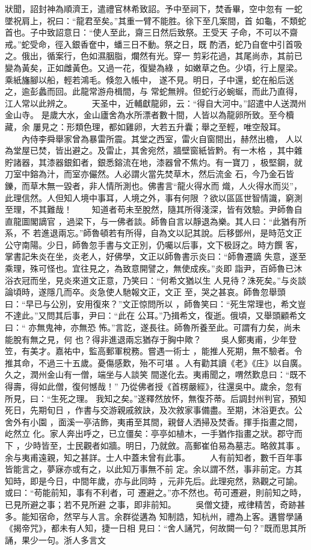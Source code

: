 \documentclass{ctexart}
\begin{document}
狀聞，詔封神為順濟王，遣禮官林希致詔。予中至祠下，焚香畢，空中忽有 一蛇墜祝肩上，祝曰：``龍君至矣。''其重一臂不能胜。徐下至几案間，首 如龜，不類蛇首也。子中致詔意日：``使人至此，齋三日然后致祭。王受天 子命，不可以不齋戒。''蛇受命，徑入銀香奩中，蟠三日不動。祭之日，既 酌洒，蛇乃自奩中引首吸之。俄出，循案行，色如濕胭脂，爛然有光。穿一 剪彩花過，其尾尚赤，其前已變為黃矣，正如雌黃色。又過一花，復變為綠 ，如嫩草之色。少頃，行上屋梁。乘紙旛腳以船，輕若鴻毛。倏忽入帳中， 遂不見。明日，子中還，蛇在船后送之，逾彭蠡而回。此龍常游舟楫間，与 常蛇無辨。但蛇行必蜿蜒，而此乃直得，江人常以此辨之。 　　天圣中，近輔獻龍卵，云：``得自大河中。''詔遣中人送潤州金山寺。 是歲大水，金山廬舍為水所漂者數十間，人皆以為龍卵所致。至今櫝藏，余 屢見之：形類色理，都如雞卵，大若五升囊；舉之至輕，唯空殼耳。 　　內侍李舜舉家曾為暴雷所震。其堂之西室，雷火自窗間出，赫然出檐， 人以為堂屋已焚，皆出避之。及雷止，其舍宛然，牆壁窗紙皆黔。有一木格 ，其中雜貯諸器，其漆器銀釦者，銀悉鎔流在地，漆器曾不焦灼。有一寶刀 ，极堅鋼，就刀室中鎔為汁，而室亦儼然。人必謂火當先焚草木，然后流金 石，今乃金石皆鑠，而草木無一毀者，非人情所測也。佛書言``龍火得水而 熾，人火得水而災''，此理信然。人但知人境中事耳，人境之外，事有何限 ？欲以區區世智情識，窮測至理，不其難哉！ 　　知道者苟未至脫然，隨其所得淺深，皆有效驗。尹師魯自直龍圖閣謫官 ，過梁下，与一佛者談。師魯自言以靜退為樂。其人曰：``此猶有所系，不 若進退兩忘。''師魯頓若有所得，自為文以記其說。后移鄧州，是時范文正 公守南陽。少日，師魯忽手書与文正別，仍囑以后事，文下极訝之。時方饌 客，掌書記朱炎在坐，炎老人，好佛學，文正以師魯書示炎曰：``師魯遷謫 失意，遂至乘理，殊可怪也。宜往見之，為致意開譬之，無使成疾。''炎即 詣尹，百師魯已沐浴衣冠而坐，見炎來道文正意，乃笑曰：``何希文猶以生 人見待？洙死矣。''与炎談論頃時，遂隱几而卒。炎急使人馳報文正，文正 至，哭之甚哀。師魯忽舉頭曰：``早已与公別，安用復來？''文正惊問所以 ，師魯笑曰：``死生常理也，希文豈不達此。''又問其后事，尹曰：``此在 公耳。''乃揖希文，復逝。俄頃，又舉頭顧希文曰：`` 亦無鬼神，亦無恐 怖。''言訖，遂長往。師魯所養至此。可謂有力矣，尚未能脫有無之見，何 也？得非進退兩忘猶存于胸中歟？ 　　吳人鄭夷甫，少年登笠，有美才。嘉祐中，監高郵軍稅務。嘗遇一術士 ，能推人死期，無不驗者。令推其命，不過三十五歲。憂傷感歎，殆不可堪 。人有勸其讀《老》《庄》以自廣。久之，潤州金山有一僧，端坐与人談笑 間遂化去。夷甫聞之，喟然歎息曰：``既不得壽，得如此僧，復何憾哉！'' 乃從佛者授《首楞嚴經》，往還吳中。歲余，忽有所見，曰：``生死之理。 我知之矣。''遂釋然放怀，無復芥蒂。后調封州判官，預知死日，先期旬日 ，作書与交游親戚敘訣，及次敘家事備盡。至期，沐浴更衣。公舍外有小園 ，面溪一亭洁飾，夷甫至其間，親督人洒掃及焚香。揮手指畫之間，屹然立 化。家人奔出呼之，已立僵矣：亭亭如植木，一手猶作指畫之狀。郡守而下 ，少時皆至，士民觀者如牆。明日，乃就斂。高郵崔伯易為墓志。略敘其事 。余与夷甫遠親，知之甚詳。士人中蓋未曾有此事。 　　人有前知者，數千百年事皆能言之，夢寐亦或有之，以此知万事無不前 定。余以謂不然，事非前定。方其知時，即是今日，中間年歲，亦与此同時 ，元非先后。此理宛然，熟觀之可諭。或曰：``苟能前知，事有不利者，可 遷避之。''亦不然也。苟可遷避，則前知之時，已見所避之事；若不見所避 之事，即非前知。 　　吳僧文捷，戒律精苦，奇跡甚多。能知宿命，然罕与人言。余群從遘為 知制誥，知杭州，禮為上客。遘嘗學誦《揭帝咒》，都未有人知，捷一日相 見曰：``舍人誦咒，何故闕一句？''既而思其所誦，果少一句。浙人多言文 
\end{document}
